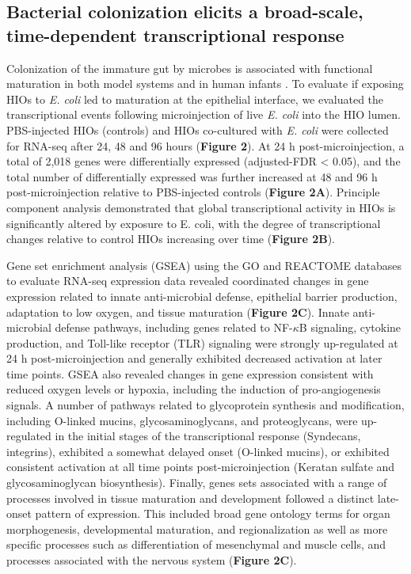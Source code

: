 \documentclass[9pt,lineo]{elife}
\begin{document}
\subsection*{{\bfseries\sffamily } Bacterial colonization elicits a broad-scale, time-dependent transcriptional response}
\label{sec:orgheadline4}
Colonization of the immature gut by microbes is associated with functional maturation in both model systems\citep{Kremer:2013,Sommer:2015,Broderick:2014,Erkosar:2015} and in human infants \citep{Renz:2012}. To evaluate if exposing HIOs to \emph{E. coli} led to maturation at the epithelial interface, we evaluated the transcriptional events following microinjection of live \emph{E. coli}  into the HIO lumen. PBS-injected HIOs (controls) and HIOs co-cultured with \emph{E. coli} were collected for RNA-seq after 24, 48 and 96 hours (\textbf{Figure 2}). At 24 h post-microinjection, a total of 2,018 genes were differentially expressed (adjusted-FDR < 0.05), and the total number of differentially expressed was further increased at 48 and 96 h post-microinjection relative to PBS-injected controls (\textbf{Figure 2A}). Principle component analysis demonstrated that global transcriptional activity in HIOs is significantly altered by exposure to E. coli, with the degree of transcriptional changes relative to control HIOs increasing over time (\textbf{Figure 2B}).

Gene set enrichment analysis (GSEA) \citep{Subramanian:2005} using the GO \citep{Ashburner:2000,Gene_Ontology_Consortium:2015} and REACTOME \citep{Croft:2014,Fabregat:2016} databases to evaluate RNA-seq expression data revealed coordinated changes in gene expression related to innate anti-microbial defense, epithelial barrier production, adaptation to low oxygen, and tissue maturation (\textbf{Figure 2C}). Innate anti-microbial defense pathways, including genes related to NF-\(\kappa\)B signaling, cytokine production, and Toll-like receptor (TLR) signaling were strongly up-regulated at 24 h post-microinjection and generally exhibited decreased activation at later time points. GSEA also revealed changes in gene expression consistent with reduced oxygen levels or hypoxia, including the induction of pro-angiogenesis signals. A number of pathways related to glycoprotein synthesis and modification, including O-linked mucins, glycosaminoglycans, and proteoglycans, were up-regulated in the initial stages of the transcriptional response (Syndecans, integrins), exhibited a somewhat delayed onset (O-linked mucins), or exhibited consistent activation at all time points post-microinjection (Keratan sulfate and glycosaminoglycan biosynthesis). Finally, genes sets associated with a range of processes involved in tissue maturation and development followed a distinct late-onset pattern of expression. This included broad gene ontology terms for organ morphogenesis, developmental maturation, and regionalization as well as more specific processes such as differentiation of mesenchymal and muscle cells, and processes associated with the nervous system (\textbf{Figure 2C}).
\end{document}

